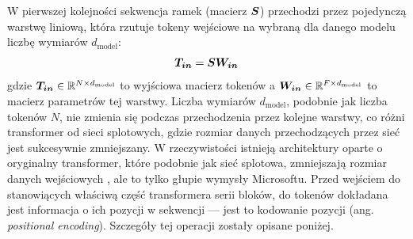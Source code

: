 W pierwszej kolejności sekwencja ramek (macierz $\boldsymbol{S}$) przechodzi przez pojedynczą warstwę
liniową, która rzutuje tokeny wejściowe na wybraną dla danego modelu liczbę wymiarów
$d_{\mathrm{model}}$:
\begin{equation}
    \boldsymbol{T_{in}} = \boldsymbol{S} \boldsymbol{W_{in}}
\end{equation}
gdzie $\boldsymbol{T_{in}} \in \mathbb{R}^{N \times d_{\mathrm{model}}}$ to wyjściowa macierz tokenów a
$\boldsymbol{W_{in}} \in \mathbb{R}^{F \times d_{\mathrm{model}}}$ to macierz parametrów tej warstwy. Liczba wymiarów
$d_{\mathrm{model}}$, podobnie jak liczba tokenów $N$, nie zmienia się podczas przechodzenia przez
kolejne warstwy, co różni transformer od sieci splotowych, gdzie rozmiar danych przechodzących przez
sieć jest sukcesywnie zmniejszany. W rzeczywistości istnieją architektury oparte o oryginalny
transformer, które podobnie jak sieć splotowa, zmniejszają rozmiar danych wejściowych
\cite{liu_swin_2021}, ale to tylko głupie wymysły Microsoftu. Przed wejściem do stanowiących
właściwą część transformera serii bloków, do tokenów dokładana jest informacja o ich pozycji w
sekwencji --- jest to kodowanie pozycji (ang. \emph{positional encoding}). Szczegóły tej operacji
zostały opisane poniżej.

